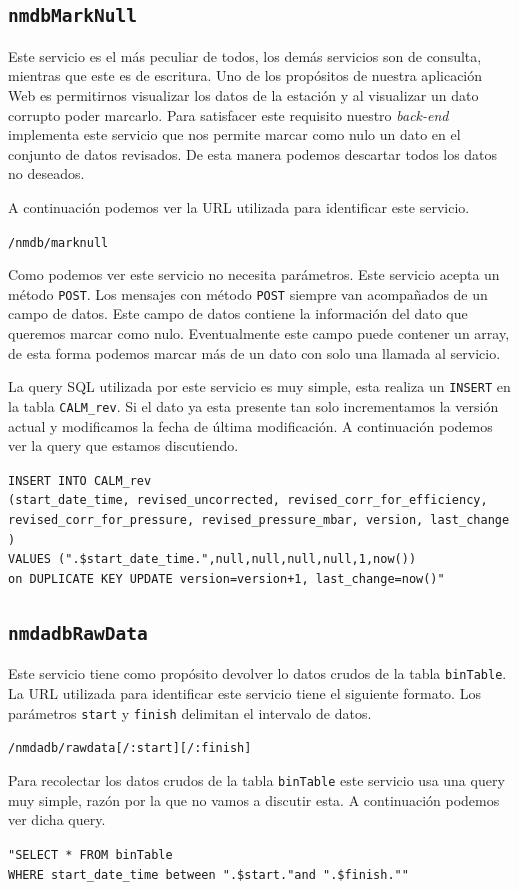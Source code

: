 {	\subsection{\texttt{nmdbMarkNull}}
		Este servicio es el más peculiar de todos, los demás servicios son de consulta, mientras que este es de escritura. Uno de los
		propósitos de nuestra aplicación Web es permitirnos visualizar los datos de la estación y al visualizar un dato corrupto poder
		marcarlo. Para satisfacer este requisito nuestro \emph{back-end} implementa este servicio que nos permite marcar como nulo un dato en
		el conjunto de datos revisados. De esta manera podemos descartar todos los datos no deseados.
		\par
		A continuación podemos ver la URL utilizada para identificar este servicio.
			\begin{center} \texttt{/nmdb/marknull}  \end{center}
		Como podemos ver este servicio no necesita parámetros. Este servicio acepta un método \texttt{POST}. Los  mensajes con método
		\texttt{POST} siempre van acompañados de un campo de datos. Este campo de datos contiene la información del dato que queremos marcar
		como nulo. Eventualmente este campo puede contener un array, de esta forma podemos marcar más de un dato con solo una llamada al servicio.
		\par 
		La query SQL utilizada por este servicio es muy simple, esta realiza un \texttt{INSERT} en la tabla \texttt{CALM\_rev}. Si el dato ya
		esta presente tan solo incrementamos la versión actual y modificamos la fecha de última modificación. A continuación podemos ver la
		query que estamos discutiendo.
			\begin{center} \texttt{\textquotedbl INSERT INTO CALM\_rev 
			  		\\	(start\_date\_time, revised\_uncorrected, revised\_corr\_for\_efficiency, revised\_corr\_for\_pressure, revised\_pressure\_mbar, version, last\_change )
				      	\\	VALUES (\cc".\$start\_date\_time."\cc,null,null,null,null,1,now()) 
				      	\\	on DUPLICATE KEY UPDATE version=version+1, last\_change=now()"}
			\end{center} 
	\subsection{\texttt{nmdadbRawData}}
		Este servicio tiene como propósito devolver lo datos crudos de la tabla \texttt{binTable}. La URL utilizada para identificar este
		servicio tiene el siguiente formato. Los parámetros \texttt{start} y \texttt{finish} delimitan el intervalo de datos.
	  		\begin{center} \texttt{/nmdadb/rawdata[/:start][/:finish]}  \end{center} 
		Para recolectar los datos crudos de la tabla \texttt{binTable} este servicio usa una query muy simple, razón por la que no vamos a
		discutir esta. A continuación podemos ver dicha query.
	  		\begin{center} \texttt{"SELECT * FROM binTable 
			  		\\	WHERE start\_date\_time between \cc".\$start."\cc and \cc".\$finish."\cc"}
			\end{center} 
}
